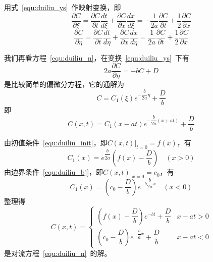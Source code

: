 \documentclass[xcolor=dvipsnames]{beamer}
\begin{document}
\begin{frame}
用式~\ref{equ:duiliu_ys}~作映射变换，即
\begin{equation}
\dfrac{\partial C}{\partial \xi}=\dfrac{\partial C}{\partial t}\dfrac{dt}{d\xi}+
								 \dfrac{\partial C}{\partial x}\dfrac{dx}{d\xi}
								=-\dfrac{1}{2a}\dfrac{\partial C}{\partial t}+\dfrac{1}{2}\dfrac{\partial C}{\partial x}						
\end{equation}
\begin{equation}
\dfrac{\partial C}{\partial \eta}=\dfrac{\partial C}{\partial t}\dfrac{dt}{d\eta}+
								 \dfrac{\partial C}{\partial x}\dfrac{dx}{d\eta}
								=\dfrac{1}{2a}\dfrac{\partial C}{\partial t}+
								\dfrac{1}{2}\dfrac{\partial C}{\partial x}		
\end{equation}\par
\end{frame}
\begin{frame}
我们再看方程~\ref{equ:duiliu_n}，在变换~\ref{equ:duiliu_ys}~下有
\begin{equation}
2a\dfrac{\partial C}{\partial \eta} = -bC+D
\end{equation}
是比较简单的偏微分方程，它的通解为
\begin{equation}
C=C_1(\xi)e^{-\dfrac{b}{2a}\eta}+\dfrac{D}{b}
\end{equation}
即
\begin{equation}
C(x,t)=C_1(x-at)e^{-\dfrac{b}{2a}(x+at)}+\dfrac{D}{b}
\end{equation}
\end{frame}
\begin{frame}
由初值条件~\ref{equ:duiliu_init}，即$\left.C(x,t)\right|_{t=0}=f(x)$，有
\begin{equation}
C_1(x)=e^{\dfrac{b}{2a}}\left(f(x)-\dfrac{D}{b}\right)\quad(x>0)
\end{equation}
由边界条件~\ref{equ:duiliu_bj}，即$\left.C(x,t)\right|_{x=0}=c_0$，有
\begin{equation}
C_1(x)=\left(c_0-\dfrac{D}{b}\right)e^{-b\dfrac{b}{2a}x}\quad(x<0)
\end{equation}
整理得
\begin{equation}
C(x,t)=
\begin{cases}
\left(f(x)-\dfrac{D}{b}\right)e^{-bt}+\dfrac{D}{b}  & x-at>0 \\
\left(c_0-\dfrac{D}{b}\right)e^{-\dfrac{b}{a}x}+\dfrac{D}{b}	&x-at<0
\end{cases}
\end{equation}
是对流方程~\ref{equ:duiliu_n}~的解。\par
\end{frame}
\end{document}
